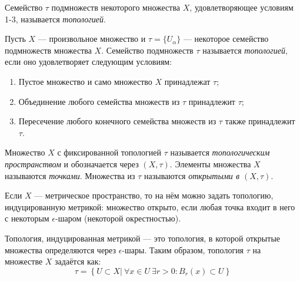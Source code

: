
\begin{definition}
    Семейство $\tau$ подмножеств некоторого множества $X$, удовлетворяющее условиям 1-3, называется \textit{топологией}.
\end{definition}

\begin{definition}
    Пусть $X$ — произвольное множество и $\tau = \{U_{\alpha}\}$ — некоторое семейство подмножеств множества $X$. Семейство подмножеств $\tau$ называется \textit{топологией}, если оно удовлетворяет следующим условиям:
    \begin{enumerate}
        \item Пустое множество и само множество $X$ принадлежат $\tau$;
        \item Объединение любого семейства множеств из $\tau$ принадлежит $\tau$;
        \item Пересечение любого конечного семейства множеств из $\tau$ также принадлежит $\tau$.
    \end{enumerate}
\end{definition}

\begin{definition}
    Множество $X$ с фиксированной топологией $\tau$ называется \textit{топологическим пространством} и обозначается через $(X, \tau)$. Элементы множества $X$ называются \textit{точками}. Множества из $\tau$ называются \textit{открытыми в $(X, \tau)$}.
\end{definition}

Если $X$ — метрическое пространство, то на нём можно задать топологию, индуцированную метрикой: множество открыто, если любая точка входит в него с некоторым $\epsilon$-шаром (некоторой окрестностью).

Топология, индуцированная метрикой — это топология, в которой открытые множества определяются через $\epsilon$-шары. Таким образом, топология $\tau$ на множестве $X$ задаётся как:
\[\tau = \left\{U \subset X | \ \forall x \in U \ \exists r > 0: B_r(x) \subset U\right\}\]

